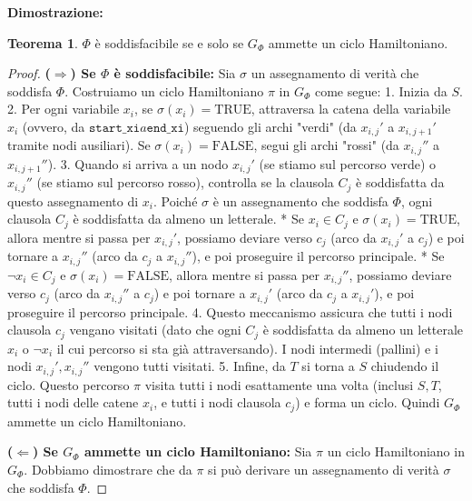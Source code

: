 \documentclass[a4paper]{article}
\theoremstyle{definition} %
\newtheorem{theorem}{Teorema}
\begin{document}
\textbf{Dimostrazione:}
\begin{theorem}
$\Phi$ è soddisfacibile se e solo se $G_\Phi$ ammette un ciclo Hamiltoniano.
\end{theorem}
\begin{proof}
\textbf{($\Rightarrow$) Se $\Phi$ è soddisfacibile:}
Sia $\sigma$ un assegnamento di verità che soddisfa $\Phi$. Costruiamo un ciclo Hamiltoniano $\pi$ in $G_\Phi$ come segue:
1.  Inizia da $S$.
2.  Per ogni variabile $x_i$, se $\sigma(x_i) = \text{TRUE}$, attraversa la catena della variabile $x_i$ (ovvero, da $\texttt{start\_xi} a \texttt{end\_xi}$) seguendo gli archi "verdi" (da $x_{i,j}'$ a $x_{i,j+1}'$ tramite nodi ausiliari). Se $\sigma(x_i) = \text{FALSE}$, segui gli archi "rossi" (da $x_{i,j}''$ a $x_{i,j+1}''$).
3.  Quando si arriva a un nodo $x_{i,j}'$ (se stiamo sul percorso verde) o $x_{i,j}''$ (se stiamo sul percorso rosso), controlla se la clausola $C_j$ è soddisfatta da questo assegnamento di $x_i$. Poiché $\sigma$ è un assegnamento che soddisfa $\Phi$, ogni clausola $C_j$ è soddisfatta da almeno un letterale.
    *   Se $x_i \in C_j$ e $\sigma(x_i) = \text{TRUE}$, allora mentre si passa per $x_{i,j}'$, possiamo deviare verso $c_j$ (arco da $x_{i,j}'$ a $c_j$) e poi tornare a $x_{i,j}''$ (arco da $c_j$ a $x_{i,j}''$), e poi proseguire il percorso principale.
    *   Se $\neg x_i \in C_j$ e $\sigma(x_i) = \text{FALSE}$, allora mentre si passa per $x_{i,j}''$, possiamo deviare verso $c_j$ (arco da $x_{i,j}''$ a $c_j$) e poi tornare a $x_{i,j}'$ (arco da $c_j$ a $x_{i,j}'$), e poi proseguire il percorso principale.
4.  Questo meccanismo assicura che tutti i nodi clausola $c_j$ vengano visitati (dato che ogni $C_j$ è soddisfatta da almeno un letterale $x_i$ o $\neg x_i$ il cui percorso si sta già attraversando). I nodi intermedi (pallini) e i nodi $x_{i,j}', x_{i,j}''$ vengono tutti visitati.
5.  Infine, da $T$ si torna a $S$ chiudendo il ciclo.
Questo percorso $\pi$ visita tutti i nodi esattamente una volta (inclusi $S, T$, tutti i nodi delle catene $x_i$, e tutti i nodi clausola $c_j$) e forma un ciclo. Quindi $G_\Phi$ ammette un ciclo Hamiltoniano.

\textbf{($\Leftarrow$) Se $G_\Phi$ ammette un ciclo Hamiltoniano:}
Sia $\pi$ un ciclo Hamiltoniano in $G_\Phi$. Dobbiamo dimostrare che da $\pi$ si può derivare un assegnamento di verità $\sigma$ che soddisfa $\Phi$.


\end{proof}
\end{document}
